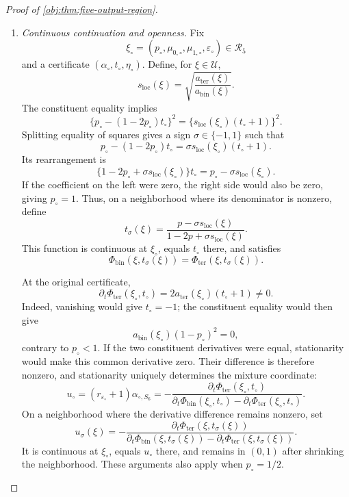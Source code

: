 \begin{proof}[Proof of \cref{obj:thm:five-output-region}]
\begin{enumerate}
\item \textit{Continuous continuation and openness.}
Fix
\[
\xi_\circ=(p_\circ,\mu_{0,\circ},\mu_{1,\circ},\varepsilon_\circ)
\in\mathcal R_5
\]
and a certificate \((\alpha_\circ,t_\circ,\eta_\circ)\).
Define, for \(\xi\in\mathcal U\),
\[
s_{\mathrm{loc}}(\xi)
=
\sqrt{\frac{a_{\mathrm{ter}}(\xi)}{a_{\mathrm{bin}}(\xi)}}.
\]
The constituent equality implies
\[
\{p_\circ-(1-2p_\circ)t_\circ\}^2
=
\{s_{\mathrm{loc}}(\xi_\circ)(t_\circ+1)\}^2.
\]
Splitting equality of squares gives a sign
\(\sigma\in\{-1,1\}\) such that
\[
p_\circ-(1-2p_\circ)t_\circ
=
\sigma s_{\mathrm{loc}}(\xi_\circ)(t_\circ+1).
\]
Its rearrangement is
\[
\{1-2p_\circ+\sigma s_{\mathrm{loc}}(\xi_\circ)\}t_\circ
=
p_\circ-\sigma s_{\mathrm{loc}}(\xi_\circ).
\]
If the coefficient on the left were zero, the right side would also be
zero, giving \(p_\circ=1\). Thus, on a neighborhood where its denominator
is nonzero, define
\[
t_\sigma(\xi)
=
\frac{p-\sigma s_{\mathrm{loc}}(\xi)}
     {1-2p+\sigma s_{\mathrm{loc}}(\xi)}.
\]
This function is continuous at \(\xi_\circ\), equals \(t_\circ\) there,
and satisfies
\[
\Phi_{\mathrm{bin}}(\xi,t_\sigma(\xi))
=
\Phi_{\mathrm{ter}}(\xi,t_\sigma(\xi)).
\]

At the original certificate,
\[
\partial_t\Phi_{\mathrm{ter}}(\xi_\circ,t_\circ)
=
2a_{\mathrm{ter}}(\xi_\circ)(t_\circ+1)\ne0.
\]
Indeed, vanishing would give \(t_\circ=-1\); the constituent equality
would then give
\[
a_{\mathrm{bin}}(\xi_\circ)(1-p_\circ)^2=0,
\]
contrary to \(p_\circ<1\).
If the two constituent derivatives were equal, stationarity would make
this common derivative zero. Their difference is therefore nonzero, and
stationarity uniquely determines the mixture coordinate:
\[
u_\circ=(r_{\varepsilon_\circ}+1)\alpha_{\circ,S_6}
=
-\frac{\partial_t\Phi_{\mathrm{ter}}(\xi_\circ,t_\circ)}
       {\partial_t\Phi_{\mathrm{bin}}(\xi_\circ,t_\circ)
        -\partial_t\Phi_{\mathrm{ter}}(\xi_\circ,t_\circ)}.
\]
On a neighborhood where the derivative difference remains nonzero, set
\[
u_\sigma(\xi)
=
-\frac{\partial_t\Phi_{\mathrm{ter}}(\xi,t_\sigma(\xi))}
       {\partial_t\Phi_{\mathrm{bin}}(\xi,t_\sigma(\xi))
        -\partial_t\Phi_{\mathrm{ter}}(\xi,t_\sigma(\xi))}.
\]
It is continuous at \(\xi_\circ\), equals \(u_\circ\) there, and remains in
\((0,1)\) after shrinking the neighborhood. These arguments also apply
when \(p_\circ=1/2\).


\end{enumerate}
\end{proof}

